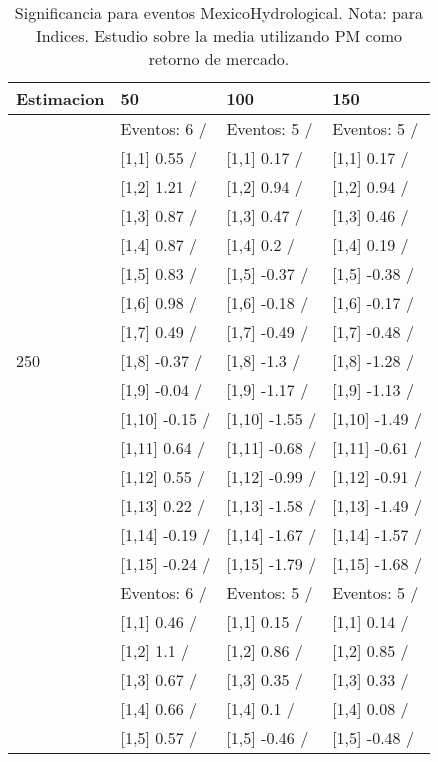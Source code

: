\begin{table}

\caption{Significancia para eventos MexicoHydrological. Nota: para Indices. Estudio sobre la media utilizando PM como retorno de mercado.}
\centering
\begin{tabular}[t]{llll}
\toprule
Estimacion & 50 & 100 & 150\\
\midrule
 & Eventos:  6 / & Eventos:  5 / & Eventos:  5 /\\
 & {}[1,1] 0.55  / & {}[1,1] 0.17  / & {}[1,1] 0.17  /\\
 & {}[1,2] 1.21  / & {}[1,2] 0.94  / & {}[1,2] 0.94  /\\
 & {}[1,3] 0.87  / & {}[1,3] 0.47  / & {}[1,3] 0.46  /\\
 & {}[1,4] 0.87  / & {}[1,4] 0.2  / & {}[1,4] 0.19  /\\
\addlinespace
 & {}[1,5] 0.83  / & {}[1,5] -0.37  / & {}[1,5] -0.38  /\\
 & {}[1,6] 0.98  / & {}[1,6] -0.18  / & {}[1,6] -0.17  /\\
 & {}[1,7] 0.49  / & {}[1,7] -0.49  / & {}[1,7] -0.48  /\\
250 & {}[1,8] -0.37  / & {}[1,8] -1.3  / & {}[1,8] -1.28  /\\
 & {}[1,9] -0.04  / & {}[1,9] -1.17  / & {}[1,9] -1.13  /\\
\addlinespace
 & {}[1,10] -0.15  / & {}[1,10] -1.55  / & {}[1,10] -1.49  /\\
 & {}[1,11] 0.64  / & {}[1,11] -0.68  / & {}[1,11] -0.61  /\\
 & {}[1,12] 0.55  / & {}[1,12] -0.99  / & {}[1,12] -0.91  /\\
 & {}[1,13] 0.22  / & {}[1,13] -1.58  / & {}[1,13] -1.49  /\\
 & {}[1,14] -0.19  / & {}[1,14] -1.67  / & {}[1,14] -1.57  /\\
\addlinespace
 & {}[1,15] -0.24  / & {}[1,15] -1.79  / & {}[1,15] -1.68  /\\
 & Eventos:  6 / & Eventos:  5 / & Eventos:  5 /\\
 & {}[1,1] 0.46  / & {}[1,1] 0.15  / & {}[1,1] 0.14  /\\
 & {}[1,2] 1.1  / & {}[1,2] 0.86  / & {}[1,2] 0.85  /\\
 & {}[1,3] 0.67  / & {}[1,3] 0.35  / & {}[1,3] 0.33  /\\
\addlinespace
 & {}[1,4] 0.66  / & {}[1,4] 0.1  / & {}[1,4] 0.08  /\\
 & {}[1,5] 0.57  / & {}[1,5] -0.46  / & {}[1,5] -0.48  /\\

\end{tabular}
\end{table}
